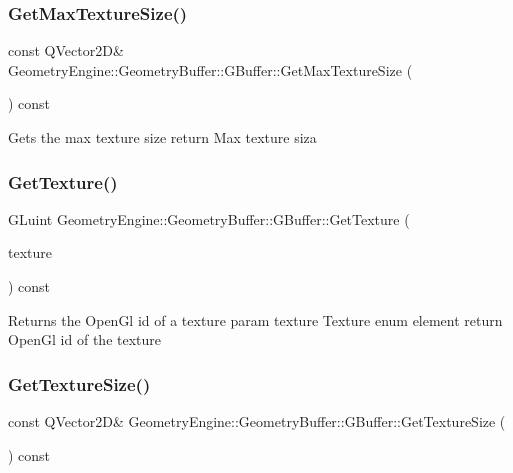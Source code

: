 \subsubsection{\texorpdfstring{GetMaxTextureSize()}{GetMaxTextureSize()}}
{\footnotesize\ttfamily const Q\+Vector2D\& Geometry\+Engine\+::\+Geometry\+Buffer\+::\+G\+Buffer\+::\+Get\+Max\+Texture\+Size (\begin{DoxyParamCaption}{ }\end{DoxyParamCaption}) const\hspace{0.3cm}{\ttfamily [inline]}}

Gets the max texture size return Max texture siza \mbox{\label{class_geometry_engine_1_1_geometry_buffer_1_1_g_buffer_a798b7520f23c545e09d58639bd275f16}} 
\subsubsection{\texorpdfstring{GetTexture()}{GetTexture()}}
{\footnotesize\ttfamily G\+Luint Geometry\+Engine\+::\+Geometry\+Buffer\+::\+G\+Buffer\+::\+Get\+Texture (\begin{DoxyParamCaption}\item[{\mbox{\hyperlink{class_geometry_engine_1_1_geometry_buffer_1_1_g_buffer_a718dceafcac1915f7de061108597e1cc}{G\+B\+U\+F\+F\+E\+R\+\_\+\+T\+E\+X\+T\+U\+R\+E\+\_\+\+T\+Y\+PE}}}]{texture }\end{DoxyParamCaption}) const\hspace{0.3cm}{\ttfamily [inline]}}

Returns the Open\+Gl id of a texture param texture Texture enum element return Open\+Gl id of the texture \mbox{\label{class_geometry_engine_1_1_geometry_buffer_1_1_g_buffer_a2b829115597fc587cd6f4ddb52b875cc}} 
\subsubsection{\texorpdfstring{GetTextureSize()}{GetTextureSize()}}
{\footnotesize\ttfamily const Q\+Vector2D\& Geometry\+Engine\+::\+Geometry\+Buffer\+::\+G\+Buffer\+::\+Get\+Texture\+Size (\begin{DoxyParamCaption}{ }\end{DoxyParamCaption}) const\hspace{0.3cm}{\ttfamily [inline]}}

